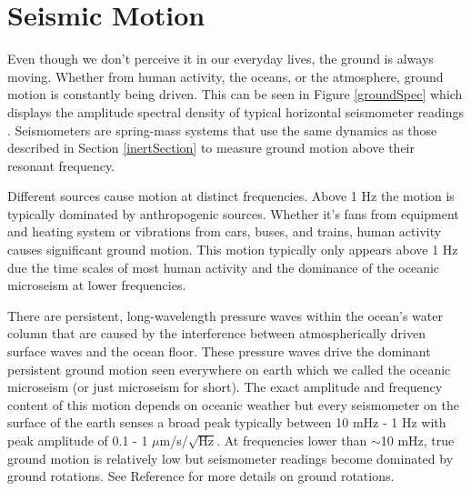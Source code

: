 \documentclass{book}
\begin{document}
\section{Seismic Motion}

\quad Even though we don't perceive it in our everyday lives, the ground is always moving. Whether from human activity, the oceans, or the atmosphere, ground motion is constantly being driven. This can be seen in Figure \ref{groundSpec} which displays the amplitude spectral density of typical horizontal seismometer readings \cite{ross2020precision}. Seismometers are spring-mass systems that use the same dynamics as those described in Section \ref{inertSection} to measure ground motion above their resonant frequency. 

Different sources cause motion at distinct frequencies. Above 1 Hz the motion is typically dominated by anthropogenic sources. Whether it's fans from equipment and heating system or vibrations from cars, buses, and trains, human activity causes significant ground motion. This motion typically only appears above 1 Hz due the time scales of most human activity and the dominance of the oceanic microseism at lower frequencies. 

There are persistent, long-wavelength pressure waves within the ocean's water column that are caused by the interference between atmospherically driven surface waves and the ocean floor. These pressure waves drive the dominant persistent ground motion seen everywhere on earth which we called the oceanic microseism (or just microseism for short). The exact amplitude and frequency content of this motion depends on oceanic weather but every seismometer on the surface of the earth senses a broad peak typically between 10 mHz - 1 Hz with peak amplitude of 0.1 - 1 $\mu$m/s/$\sqrt{\text{Hz}}$. At frequencies lower than $\sim$10 mHz, true ground motion is relatively low but seismometer readings become dominated by ground rotations. See Reference \cite{ross2020precision} for more details on ground rotations.
\end{document}
